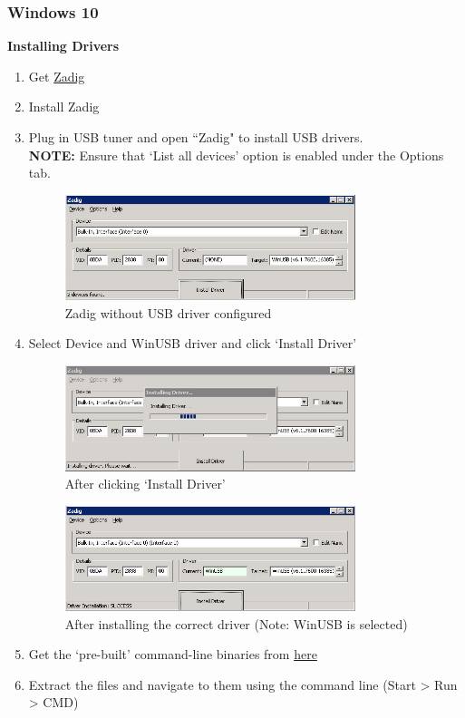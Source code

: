 \documentclass[12pt]{article}
\begin{document}
\subsubsection{Windows 10}
\textbf{Installing Drivers}
\begin{enumerate}
	\item Get \href{http://zadig.akeo.ie/}{Zadig}
	\item Install Zadig
	\item Plug in USB tuner and open ``Zadig" to install USB drivers.\\ \textbf{NOTE:} Ensure that `List all devices' option is enabled under the Options tab.
	\begin{figure}[H]
		\centering
	    \includegraphics[width=0.8\textwidth]{install_win10-s1.png}
		\caption{Zadig without USB driver configured}
		\label{fig:install_win10-s1}
	\end{figure} 
	\item Select Device and WinUSB driver and click `Install Driver'
	\begin{figure}[H]
		\centering
	    \includegraphics[width=0.8\textwidth]{install_win10-s2.png}
		\caption{After clicking `Install Driver'}
		\label{fig:install_win10-s2}
	\end{figure} 
	\begin{figure}[H]
		\centering
	    \includegraphics[width=0.8\textwidth]{install_win10-s3.png}
		\caption{After installing the correct driver (Note: WinUSB is selected)}
		\label{fig:install_win10-s3}
	\end{figure} 
	\item Get the `pre-built' command-line binaries from \href{http://sdr.osmocom.org/trac/attachment/wiki/rtl-sdr/RelWithDebInfo.zip}{here}
	\item Extract the files and navigate to them using the command line (Start > Run > CMD)
\end{enumerate}
\end{document}
